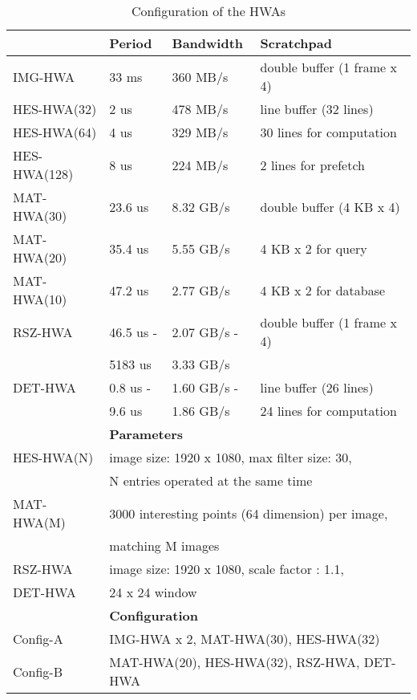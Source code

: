 \documentclass[10pt,letterpaper]{article}
\begin{document}
\begin{table}[t!]
\vspace{-2mm}
\footnotesize
\centering
\setlength{\tabcolsep}{.3em}
  \begin{tabular}{|l|l|l|l|}
    \hline
    & \textbf{Period} & \textbf{Bandwidth} & \textbf{Scratchpad} \\
    \hline
    IMG-HWA & 33 ms & 360 MB/s & double buffer (1 frame x 4) \\
    \hline
    HES-HWA(32) & 2 us & 478 MB/s & line buffer (32 lines)\\
    \cline{1-3}
    HES-HWA(64) & 4 us & 329 MB/s & 30 lines for computation\\
    \cline{1-3}
    HES-HWA(128) & 8 us & 224 MB/s & 2 lines for prefetch\\
    \hline
    MAT-HWA(30) & 23.6 us & 8.32 GB/s & double buffer (4 KB x 4)\\
    \cline{1-3}
    MAT-HWA(20) & 35.4 us & 5.55 GB/s & 4 KB x 2 for query\\
    \cline{1-3}
    MAT-HWA(10) & 47.2 us & 2.77 GB/s & 4 KB x 2 for database\\
    \hline
    RSZ-HWA & 46.5 us - & 2.07 GB/s - & double buffer (1 frame x 4) \\
    & 5183 us & 3.33 GB/s & \\
    \hline
    DET-HWA & 0.8 us - & 1.60 GB/s - & line buffer (26 lines) \\
    & 9.6 us & 1.86 GB/s & 24 lines for computation \\
    \hline
    \hline
    & \multicolumn{3}{l|}{\textbf{Parameters}} \\
\hline
    HES-HWA(N) & \multicolumn{3}{l|}{ image size: 1920 x 1080, max filter size:
    30,} \\
    ~\cite{mra} & \multicolumn{3}{l|}{N entries operated at the same time}\\
    \hline
    MAT-HWA(M) & \multicolumn{3}{l|}{ 3000 interesting points (64 dimension) per
    image,} \\
    ~\cite{mra} & \multicolumn{3}{l|}{matching M images} \\
    \hline
    RSZ-HWA & \multicolumn{3}{l|}{ image size: 1920 x 1080, scale factor : 1.1,} \\
    DET-HWA~\cite{opencv} & \multicolumn{3}{l|}{ 24 x 24 window } \\
    \hline
    \hline
    & \multicolumn{3}{l|}{\textbf{Configuration}} \\
    \hline
    Config-A & \multicolumn{3}{l|}{ IMG-HWA x 2, MAT-HWA(30), HES-HWA(32) } \\
    \hline
    Config-B & \multicolumn{3}{l|}{ MAT-HWA(20), HES-HWA(32), RSZ-HWA, DET-HWA } \\
    \hline
  \end{tabular}
  \vspace{-2mm}
  \caption{Configuration of the HWAs}
  \label{tab:hwa_env}
\vspace{-2mm}
\end{table}
\end{document}
